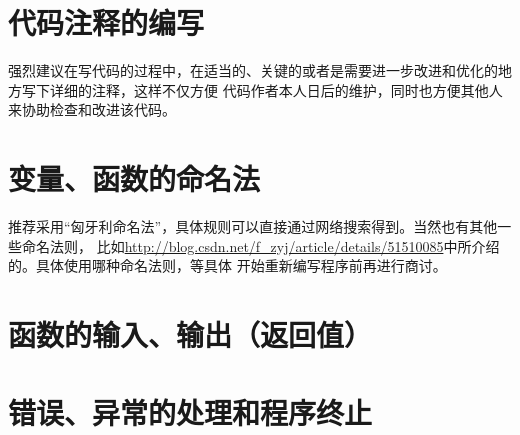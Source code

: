 \begin{appendix}
\section{代码注释的编写}
强烈建议在写代码的过程中，在适当的、关键的或者是需要进一步改进和优化的地方写下详细的注释，这样不仅方便
代码作者本人日后的维护，同时也方便其他人来协助检查和改进该代码。

\section{变量、函数的命名法}
推荐采用“匈牙利命名法”，具体规则可以直接通过网络搜索得到。当然也有其他一些命名法则，
比如\url{http://blog.csdn.net/f_zyj/article/details/51510085}中所介绍的。具体使用哪种命名法则，等具体
开始重新编写程序前再进行商讨。

\section{函数的输入、输出（返回值）}


\section{错误、异常的处理和程序终止}


\end{appendix}
